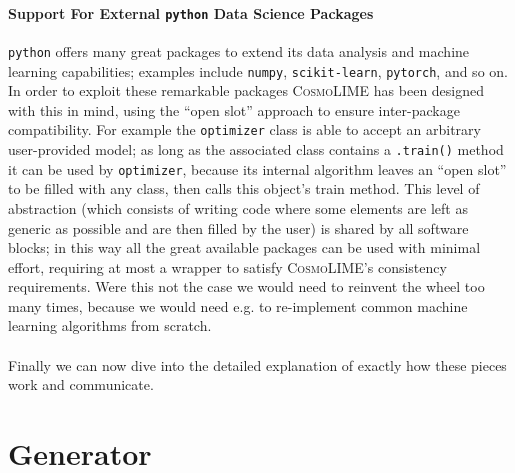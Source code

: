\paragraph{Support For External \texttt{python} Data Science Packages}
\texttt{python} offers many great packages to extend its data analysis and machine learning capabilities; examples include \texttt{numpy}, \texttt{scikit-learn}, \texttt{pytorch}, and so on. In order to exploit these remarkable packages \textsc{CosmoLIME} has been designed with this in mind, using the ``open slot'' approach to ensure inter-package compatibility. For example the \texttt{optimizer} class is able to accept an arbitrary user-provided model; as long as the associated class contains a \texttt{.train()} method it can be used by \texttt{optimizer}, because its internal algorithm leaves an ``open slot'' to be filled with any class, then calls this object's train method. This level of abstraction (which consists of writing code where some elements are left as generic as possible and are then filled by the user) is shared by all software blocks; in this way all the great available packages can be used with minimal effort, requiring at most a wrapper to satisfy \textsc{CosmoLIME}'s consistency requirements. Were this not the case we would need to reinvent the wheel too many times, because we would need e.g. to re-implement common machine learning algorithms from scratch.

\paragraph{}
Finally we can now dive into the detailed explanation of exactly how these pieces work and communicate.


\section{Generator}



